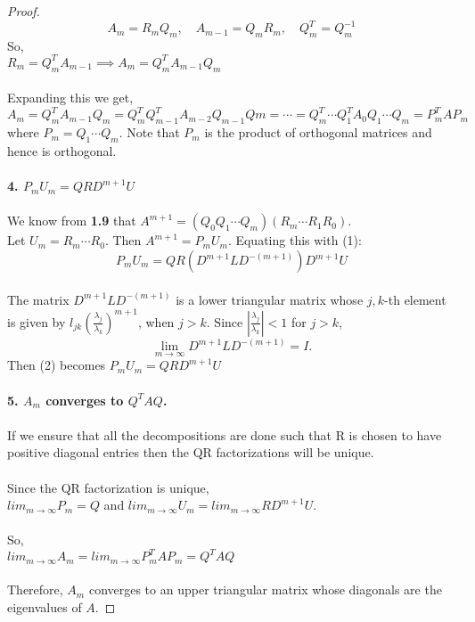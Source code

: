 \documentclass[12pt]{article}
\begin{document}
\begin{proof}
        \[ 
            A_{m} = R_mQ_m, \quad A_{m-1}=Q_mR_m, \quad Q_m^T = Q_m^{-1} 
        \]
        So, \\
        $ R_m = Q_m^TA_{m-1} \implies A_{m} = Q^T_mA_{m-1}Q_m$\\ \\
        Expanding this we get, \\
        \[
            A_m = Q^T_mA_{m-1}Q_m = Q^T_m Q^T_{m-1} A_{m-2} Q_{m-1} Qm = \cdots = Q^T_m \cdots Q^T_1A_0Q_1 \cdots Q_m = P^T_mAP_m
        \]
        where $P_m = Q_1 \cdots Q_m$. Note that $P_m$ is the product of orthogonal matrices and hence is
        orthogonal. \\\\
        \textbf{4. $P_{m}U_{m} = QR D^{m+1}U$} \\ \\
        We know from \textbf{1.9} that $A^{m+1} = (Q_0 Q_1 \cdots Q_{m}) (R_{m} \cdots R_1 R_0)$. \\
        Let $U_{m} = R_{m} \cdots R_0$. Then $A^{m+1} = P_{m}U_{m}$. Equating this with (1): \\
        \[ P_{m}U_{m} = QR (D^{m+1} L D^{-(m+1)})D^{m+1}U \tag{2} \] \\        
        The matrix \( D^{m+1} L D^{-(m+1)} \) is a lower triangular matrix whose \( j,k \)-th element is given by \( l_{jk} \left( \frac{\lambda_j}{\lambda_k} \right)^{m+1} \), when \( j > k \). Since \( \left| \frac{\lambda_j}{\lambda_k} \right| < 1 \) for \( j > k \),
        \[
        \lim_{m \to \infty} D^{m+1} L D^{-(m+1)} = I.
        \]
        Then (2) becomes $P_{m}U_{m} = QRD^{m+1}U$ \\ \\
        \textbf{5. $A_m$ converges to $Q^TAQ$.} \\ \\
        If we ensure that all the decompositions are done such that R is 
        chosen to have positive diagonal entries then the QR factorizations will
        be unique.\\\\
        Since the QR factorization is unique, \\
        $lim_{m \to \infty}P_{m} = Q$ and $lim_{m \to \infty}U_{m} = lim_{m \to \infty}RD^{m+1}U$. \\\\
        So,\\
        $lim_{m \to \infty}A_{m} = lim_{m \to \infty}P_{m}^TAP_{m} = Q^TAQ$\\\\
        Therefore, $A_m$ converges to an upper triangular matrix whose diagonals are the eigenvalues of $A$.
    \end{proof}
\end{document}
